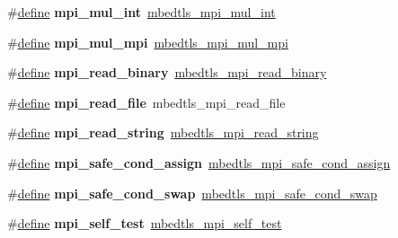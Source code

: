 \begin{DoxyCompactItemize}
\item 
\mbox{\label{compat-1_83_8h_a5668ef6c168882a9c33a8de7a0821e19}} 
\#\hyperlink{structdefine}{define} {\bfseries mpi\+\_\+mul\+\_\+int}~\hyperlink{bignum_8h_ac4a22cb29f7e19dd4c823d1868f45eab}{mbedtls\+\_\+mpi\+\_\+mul\+\_\+int}
\item 
\mbox{\label{compat-1_83_8h_acbbd38c3d0b2bd75eb7916089433912a}} 
\#\hyperlink{structdefine}{define} {\bfseries mpi\+\_\+mul\+\_\+mpi}~\hyperlink{bignum_8h_aa9065cae8e3a287095b4043317f6b706}{mbedtls\+\_\+mpi\+\_\+mul\+\_\+mpi}
\item 
\mbox{\label{compat-1_83_8h_aa1d0b9dbe5d1fda001c09d0063f5e6fb}} 
\#\hyperlink{structdefine}{define} {\bfseries mpi\+\_\+read\+\_\+binary}~\hyperlink{bignum_8h_a68f62c99e53eb034daea486e5d5d83ca}{mbedtls\+\_\+mpi\+\_\+read\+\_\+binary}
\item 
\mbox{\label{compat-1_83_8h_a3da188fc572d38f2c55cb892d9096271}} 
\#\hyperlink{structdefine}{define} {\bfseries mpi\+\_\+read\+\_\+file}~mbedtls\+\_\+mpi\+\_\+read\+\_\+file
\item 
\mbox{\label{compat-1_83_8h_a7c882f8b2248ec86376c7b65ca01e29d}} 
\#\hyperlink{structdefine}{define} {\bfseries mpi\+\_\+read\+\_\+string}~\hyperlink{bignum_8h_a15efd3f2f86700b69f6c18d34ac05758}{mbedtls\+\_\+mpi\+\_\+read\+\_\+string}
\item 
\mbox{\label{compat-1_83_8h_a43ad3d7fc639983c1122a72ee937d2a8}} 
\#\hyperlink{structdefine}{define} {\bfseries mpi\+\_\+safe\+\_\+cond\+\_\+assign}~\hyperlink{bignum_8h_a623c565706f22d8fbcc665ba49a51c7c}{mbedtls\+\_\+mpi\+\_\+safe\+\_\+cond\+\_\+assign}
\item 
\mbox{\label{compat-1_83_8h_a793a130ac27da6da278915a2aa3c8490}} 
\#\hyperlink{structdefine}{define} {\bfseries mpi\+\_\+safe\+\_\+cond\+\_\+swap}~\hyperlink{bignum_8h_a956c54f87d26ceb6da98043805e67684}{mbedtls\+\_\+mpi\+\_\+safe\+\_\+cond\+\_\+swap}
\item 
\mbox{\label{compat-1_83_8h_ae21542a1315a2ebebae234841c019f1a}} 
\#\hyperlink{structdefine}{define} {\bfseries mpi\+\_\+self\+\_\+test}~\hyperlink{bignum_8h_a75b6f4376bdceb63ef5a65737c1a638c}{mbedtls\+\_\+mpi\+\_\+self\+\_\+test}

\end{DoxyCompactItemize}
